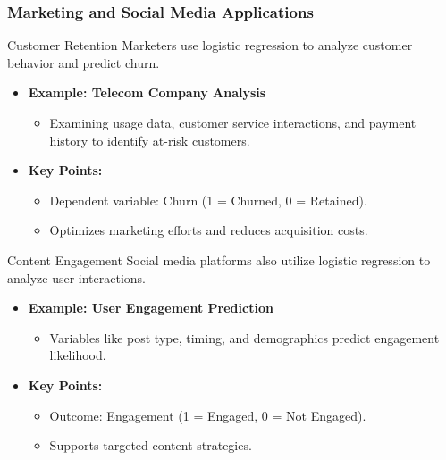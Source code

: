 \documentclass[aspectratio=169]{beamer}
\begin{document}
\begin{frame}[fragile]
    \frametitle{Marketing and Social Media Applications}
    
    \begin{block}{Customer Retention}
        Marketers use logistic regression to analyze customer behavior and predict churn.
    \end{block}

    \begin{itemize}
        \item \textbf{Example: Telecom Company Analysis}
        \begin{itemize}
            \item Examining usage data, customer service interactions, and payment history to identify at-risk customers.
        \end{itemize}

        \item \textbf{Key Points:}
        \begin{itemize}
            \item Dependent variable: Churn (1 = Churned, 0 = Retained).
            \item Optimizes marketing efforts and reduces acquisition costs.
        \end{itemize}
    \end{itemize}

    \begin{block}{Content Engagement}
        Social media platforms also utilize logistic regression to analyze user interactions.
    \end{block}

    \begin{itemize}
        \item \textbf{Example: User Engagement Prediction}
        \begin{itemize}
            \item Variables like post type, timing, and demographics predict engagement likelihood.
        \end{itemize}

        \item \textbf{Key Points:}
        \begin{itemize}
            \item Outcome: Engagement (1 = Engaged, 0 = Not Engaged).
            \item Supports targeted content strategies.
        \end{itemize}
    \end{itemize}
\end{frame}
\end{document}
